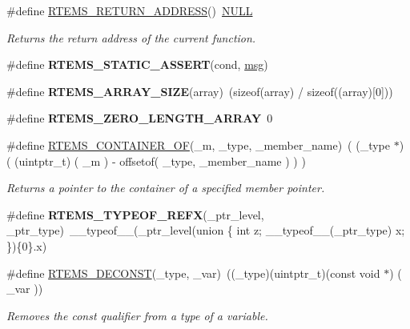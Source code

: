 \begin{DoxyCompactItemize}
\#define \mbox{\hyperlink{group__RTEMSScoreBaseDefs_ga70a1b8869a1ec49d30613af22ebc3f50}{R\+T\+E\+M\+S\+\_\+\+R\+E\+T\+U\+R\+N\+\_\+\+A\+D\+D\+R\+E\+SS}}()~\mbox{\hyperlink{bestcomm__api_8h_a872bb74de61c3689ccd5b41873fce42c}{N\+U\+LL}}
\begin{DoxyCompactList}\small\item\em Returns the return address of the current function. \end{DoxyCompactList}\item 
\#define {\bfseries R\+T\+E\+M\+S\+\_\+\+S\+T\+A\+T\+I\+C\+\_\+\+A\+S\+S\+E\+RT}(cond,  \mbox{\hyperlink{structmsg}{msg}})
\item 
\mbox{\label{group__RTEMSScoreBaseDefs_ga7b8b9087c5b43abf904e4338566ae3a1}} 
\#define {\bfseries R\+T\+E\+M\+S\+\_\+\+A\+R\+R\+A\+Y\+\_\+\+S\+I\+ZE}(array)~(sizeof(array) / sizeof((array)\mbox{[}0\mbox{]}))
\item 
\mbox{\label{group__RTEMSScoreBaseDefs_gadf1c92a3e20690290f35d317b2298032}} 
\#define {\bfseries R\+T\+E\+M\+S\+\_\+\+Z\+E\+R\+O\+\_\+\+L\+E\+N\+G\+T\+H\+\_\+\+A\+R\+R\+AY}~0
\item 
\#define \mbox{\hyperlink{group__RTEMSScoreBaseDefs_gab2e7a0141fd898ae358fa9b134aa2610}{R\+T\+E\+M\+S\+\_\+\+C\+O\+N\+T\+A\+I\+N\+E\+R\+\_\+\+OF}}(\+\_\+m,  \+\_\+type,  \+\_\+member\+\_\+name)~( (\+\_\+type $\ast$) ( (uintptr\+\_\+t) ( \+\_\+m ) -\/ offsetof( \+\_\+type, \+\_\+member\+\_\+name ) ) )
\begin{DoxyCompactList}\small\item\em Returns a pointer to the container of a specified member pointer. \end{DoxyCompactList}\item 
\mbox{\label{group__RTEMSScoreBaseDefs_ga828298bfcf1a3f0ece12f137c0badfb6}} 
\#define {\bfseries R\+T\+E\+M\+S\+\_\+\+T\+Y\+P\+E\+O\+F\+\_\+\+R\+E\+FX}(\+\_\+ptr\+\_\+level,  \+\_\+ptr\+\_\+type)~\+\_\+\+\_\+typeof\+\_\+\+\_\+(\+\_\+ptr\+\_\+level(union \{ int z; \+\_\+\+\_\+typeof\+\_\+\+\_\+(\+\_\+ptr\+\_\+type) x; \})\{0\}.x)
\item 
\#define \mbox{\hyperlink{group__RTEMSScoreBaseDefs_ga92c4be9d55b311e25e3fc6d278add2a6}{R\+T\+E\+M\+S\+\_\+\+D\+E\+C\+O\+N\+ST}}(\+\_\+type,  \+\_\+var)~((\+\_\+type)(uintptr\+\_\+t)(const void $\ast$) ( \+\_\+var ))
\begin{DoxyCompactList}\small\item\em Removes the const qualifier from a type of a variable. \end{DoxyCompactList}\item 

\end{DoxyCompactItemize}
